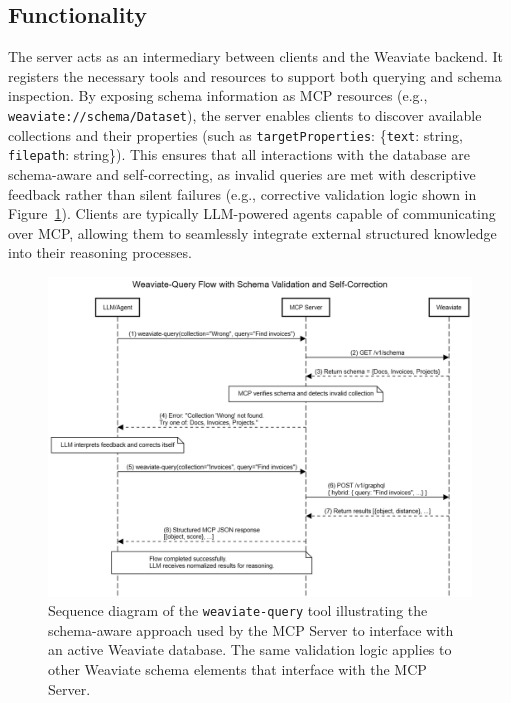\subsection{Functionality}
The server acts as an intermediary between clients and the Weaviate backend. It registers the necessary tools and resources to support both querying and schema inspection. By exposing schema information as MCP resources (e.g., \texttt{weaviate://schema/Dataset}), the server enables clients to discover available collections and their properties (such as \texttt{targetProperties}: \{\texttt{text}: string, \texttt{filepath}: string\}). This ensures that all interactions with the database are schema-aware and self-correcting, as invalid queries are met with descriptive feedback rather than silent failures (e.g., corrective validation logic shown in Figure~\ref{fig:sequence-diagram-weaviate-query}). Clients are typically \gls{LLM}-powered agents capable of communicating over \gls{MCP}, allowing them to seamlessly integrate external structured knowledge into their reasoning processes.


\begin{figure}
    \centering
    \includegraphics[width=1\linewidth]{Images/Sequence-diagram-Weaviate-Query.png}
    \caption{Sequence diagram of the \texttt{weaviate-query} tool illustrating the schema-aware approach used by the MCP Server to interface with an active Weaviate database. The same validation logic applies to other Weaviate schema elements that interface with the MCP Server.}\label{fig:sequence-diagram-weaviate-query}
\end{figure}

